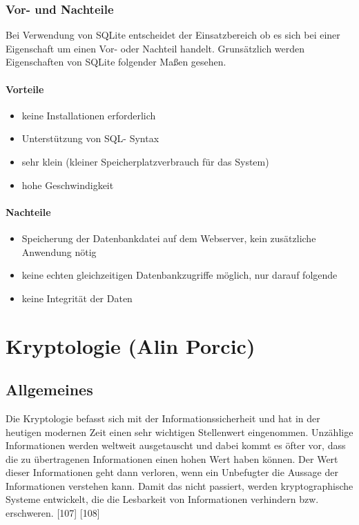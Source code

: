 \documentclass[12pt,a4paper]{report}
\begin{document}
\begin{onehalfspace}
\subsection{Vor- und Nachteile}
Bei Verwendung von SQLite entscheidet der Einsatzbereich ob es sich bei einer Eigenschaft um einen Vor- oder Nachteil handelt. Grunsätzlich werden Eigenschaften von SQLite folgender Maßen gesehen.
\subsubsection{Vorteile}
\begin{itemize}
\item keine Installationen erforderlich
\item Unterstützung von SQL- Syntax
\item sehr klein (kleiner Speicherplatzverbrauch für das System)
\item hohe Geschwindigkeit
\end{itemize}
\subsubsection{Nachteile}
\begin{itemize}
\item Speicherung der Datenbankdatei auf dem Webserver, kein zusätzliche Anwendung nötig
\item keine echten gleichzeitigen Datenbankzugriffe möglich, nur darauf folgende
\item keine Integrität der Daten
\end{itemize}

\chapter{Kryptologie (Alin Porcic)}\label{chap:krypto}
\section{Allgemeines}

Die Kryptologie befasst sich mit der Informationssicherheit und hat in der heutigen modernen Zeit einen sehr wichtigen Stellenwert eingenommen. Unzählige Informationen werden weltweit ausgetauscht und dabei kommt es öfter vor, dass die zu übertragenen Informationen einen hohen Wert haben können. Der Wert dieser Informationen geht dann verloren, wenn ein Unbefugter die Aussage der Informationen verstehen kann. Damit das nicht passiert, werden kryptographische Systeme entwickelt, die die Lesbarkeit von Informationen verhindern bzw. erschweren. [107] [108]\\


\end{onehalfspace}
\end{document}
